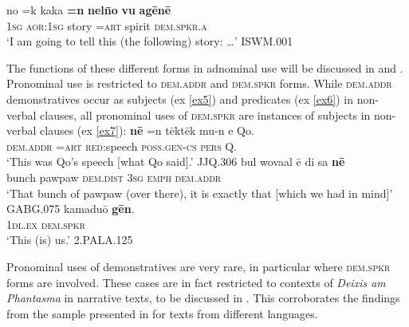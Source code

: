\documentclass[output=paper
,modfonts
,nonflat]{langsci/langscibook}
\begin{document}
\ea \label{ex4}
\gll no		=k			kaka	\textbf{=n}	\textbf{nel\=no}	\textbf{vu{\textquotesingle}}	\textbf{ag\=en\=e} \\
		\textsc{1sg}	\textsc{aor:1sg}		story	\textsc{=art}			spirit	\textsc{dem.spkr.a} \\
\glt		`I am going to tell this (the following) story: \dots'						\hfill{ISWM.001}
\z

\noindent
The functions of these different forms in adnominal use will be discussed in 	and . Pronominal use is restricted to \textsc{dem.addr} and \textsc{dem.spkr} forms. While \textsc{dem.addr} demonstratives occur as subjects (ex \ref{ex5}) and predicates (ex \ref{ex6}) in non-verbal clauses, all pronominal uses of \textsc{dem.spkr} are instances of subjects in non-verbal clauses (ex \ref{ex7}):
\ea \label{ex5}
\gll \textbf{n\=e}		=n	t\=ekt\=ek		mu-n			e		Qo{\textquotesingle}.	\\
		\textsc{dem.addr}	\textsc{=art}	\textsc{red:}speech	\textsc{poss.gen-cs}	\textsc{pers}	Q.	\\
\glt		`This was Qo{\textquotesingle}’s speech [what Qo{\textquotesingle} said].'				\hfill{JJQ.306}
\z
\ea	\label{ex6}
\gll		bul		wova{\textquotesingle}al	\=e 		di 		sa		\textbf{n\=e}		\\
		bunch		pawpaw	\textsc{dem.dist}	\textsc{3sg}	\textsc{emph}	\textsc{dem.addr}	\\
\glt	`That bunch of pawpaw (over there), it is exactly that [which we had in mind]'		\hfill{GABG.075}
\z
\ea	\label{ex7}
\gll	kamadu\=o \textbf{g\=en}.	\\
		\textsc{1dl.ex}	\textsc{dem.spkr}			\\
\glt	`This (is) us.'				\hfill{2.PALA.125}
\z

\noindent
Pronominal uses of demonstratives are very rare, in particular where \textsc{dem.spkr} forms are involved. These cases are in fact restricted to contexts of \textit{Deixis am Phantasma} in narrative texts, to be discussed in . This corroborates the findings from the sample presented in \cite[215]{Himmelmann1996} for texts from different languages.
\end{document}

